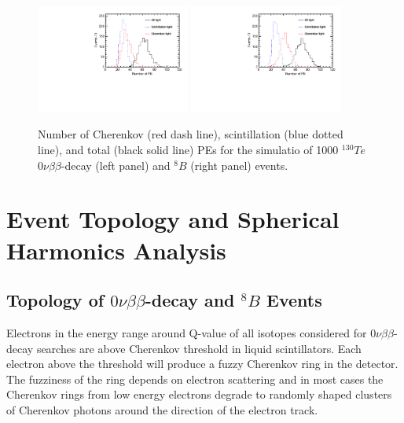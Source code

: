 \documentclass[12pt,twoside,letterpaper]{article}
\newcommand{\vbb}{0\nu\beta\beta}
\newcommand{\Te}{^{130}Te}
\newcommand{\B}{^{8}B}
\begin{document}
\begin{figure}[htb]
\centering
\includegraphics[angle=0,width=0.45\textwidth]{plots/hMomNPhot_Te130.pdf}
\includegraphics[angle=0,width=0.45\textwidth]{plots/hMomNPhot_1el_2p529MeV.pdf}
\caption{Number of Cherenkov (red dash line), scintillation (blue dotted line), and total (black solid line) PEs for the simulatio of 1000 $\Te$ $\vbb$-decay (left panel) and $\B$ (right panel) events.}
\label{fig:NPhot}
\end{figure}


\section{Event Topology and Spherical Harmonics Analysis}
\label{sec:topology_and_harmonics}

\subsection{Topology of $\vbb$-decay and $\B$ Events}
\label{subsec:topology}

Electrons in the energy range around Q-value of all isotopes considered for $\vbb$-decay searches are above Cherenkov threshold in liquid scintillators. Each electron above the threshold will produce a fuzzy Cherenkov ring in the detector. The fuzziness of the ring depends on electron scattering and in most cases the Cherenkov rings from low energy electrons degrade to randomly shaped clusters of Cherenkov photons around the direction of the electron track. 
\end{document}
